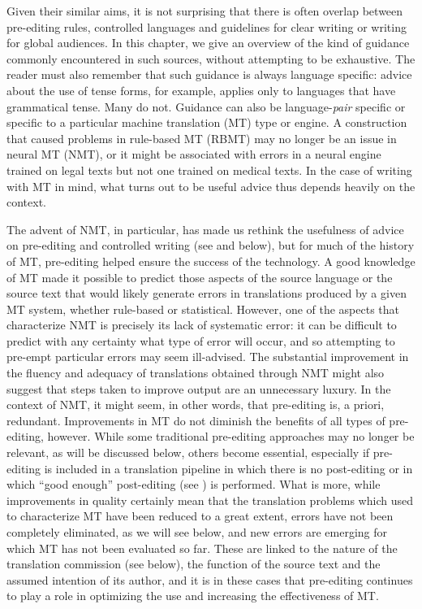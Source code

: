 \documentclass[output=paper,colorlinks,citecolor=brown,
]{langscibook}
\begin{document}
Given their similar aims, it is not surprising that there is often overlap between pre-editing rules, controlled languages and guidelines for clear writing or writing for global audiences. In this chapter, we give an overview of the kind of guidance commonly encountered in such sources, without attempting to be exhaustive. The reader must also remember that such guidance is always language specific: advice about the use of tense forms, for example, applies only to languages that have grammatical tense. Many do not. Guidance can also be language-\textit{pair} specific or specific to a particular machine translation (MT) type or engine. A construction that caused problems in rule-based MT (RBMT) may no longer be an issue in neural MT (NMT), or it might be associated with errors in a neural engine trained on legal texts but not one trained on medical texts. In the case of writing with MT in mind, what turns out to be useful advice thus depends heavily on the context.

The advent of NMT, in particular, has made us rethink the usefulness of advice on pre-editing and controlled writing (see \citealt{MarzoukHansen-Schirra2019} and  below), but for much of the history of MT, pre-editing helped ensure the success of the technology. A good knowledge of MT made it possible to predict those aspects of the source language or the source text that would likely generate errors in translations produced by a given MT system, whether rule-based or statistical. However, one of the aspects that characterize NMT is precisely its lack of systematic error: it can be difficult to predict with any certainty what type of error will occur, and so attempting to pre-empt particular errors may seem ill-advised. The substantial improvement in the fluency and adequacy of translations obtained through NMT might also suggest that steps taken to improve output are an unnecessary luxury. In the context of NMT, it might seem, in other words, that pre-editing is, a priori, redundant. Improvements in MT do not diminish the benefits of all types of pre-editing, however. While some traditional pre-editing approaches may no longer be relevant, as will be discussed below, others become essential, especially if pre-editing is included in a translation pipeline in which there is no post-editing or in which “good enough” post-editing (see ) is performed. What is more, while improvements in quality certainly mean that the translation problems which used to characterize MT have been reduced to a great extent, errors have not been completely eliminated, as we will see below, and new errors are emerging for which MT has not been evaluated so far. These are linked to the nature of the translation commission (see below), the function of the source text and the assumed intention of its author, and it is in these cases that pre-editing continues to play a role in optimizing the use and increasing the effectiveness of MT.
\end{document}
